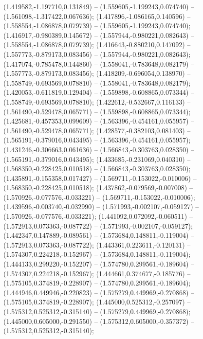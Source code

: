  (1.419582,-1.197710,0.131849) -- (1.559605,-1.199243,0.074740) -- (1.561098,-1.317422,0.067636);
 (1.417896,-1.086165,0.140596) -- (1.558554,-1.086878,0.079739) -- (1.559605,-1.199243,0.074740);
 (1.416917,-0.980389,0.145672) -- (1.557944,-0.980221,0.082643) -- (1.558554,-1.086878,0.079739);
 (1.416643,-0.880210,0.147092) -- (1.557773,-0.879173,0.083456) -- (1.557944,-0.980221,0.082643);
 (1.417074,-0.785478,0.144860) -- (1.558041,-0.783648,0.082179) -- (1.557773,-0.879173,0.083456);
 (1.418209,-0.696054,0.138970) -- (1.558749,-0.693569,0.078810) -- (1.558041,-0.783648,0.082179);
 (1.420053,-0.611819,0.129404) -- (1.559898,-0.608865,0.073344) -- (1.558749,-0.693569,0.078810);
 (1.422612,-0.532667,0.116133) -- (1.561490,-0.529478,0.065771) -- (1.559898,-0.608865,0.073344);
 (1.425681,-0.457353,0.099609) -- (1.563396,-0.454161,0.055957) -- (1.561490,-0.529478,0.065771);
 (1.428577,-0.382103,0.081403) -- (1.565191,-0.379016,0.043495) -- (1.563396,-0.454161,0.055957);
 (1.431246,-0.306663,0.061636) -- (1.566843,-0.303763,0.028350) -- (1.565191,-0.379016,0.043495);
 (1.433685,-0.231069,0.040310) -- (1.568350,-0.228425,0.010518) -- (1.566843,-0.303763,0.028350);
 (1.435891,-0.155358,0.017427) -- (1.569711,-0.153022,-0.010006) -- (1.568350,-0.228425,0.010518);
 (1.437862,-0.079569,-0.007008) -- (1.570926,-0.077576,-0.033221) -- (1.569711,-0.153022,-0.010006);
 (1.439596,-0.003740,-0.032990) -- (1.571993,-0.002107,-0.059127) -- (1.570926,-0.077576,-0.033221);
 (1.441092,0.072092,-0.060511) -- (1.572913,0.073363,-0.087722) -- (1.571993,-0.002107,-0.059127);
 (1.442347,0.147889,-0.089561) -- (1.573684,0.148811,-0.119004) -- (1.572913,0.073363,-0.087722);
 (1.443361,0.223611,-0.120131) -- (1.574307,0.224218,-0.152967) -- (1.573684,0.148811,-0.119004);
 (1.444133,0.299220,-0.152207) -- (1.574780,0.299561,-0.189604) -- (1.574307,0.224218,-0.152967);
 (1.444661,0.374677,-0.185776) -- (1.575105,0.374819,-0.228907) -- (1.574780,0.299561,-0.189604);
 (1.444946,0.449946,-0.220823) -- (1.575279,0.449969,-0.270868) -- (1.575105,0.374819,-0.228907);
 (1.445000,0.525312,-0.257097) -- (1.575312,0.525312,-0.315140) -- (1.575279,0.449969,-0.270868);
 (1.445000,0.605000,-0.291550) -- (1.575312,0.605000,-0.357372) -- (1.575312,0.525312,-0.315140);
